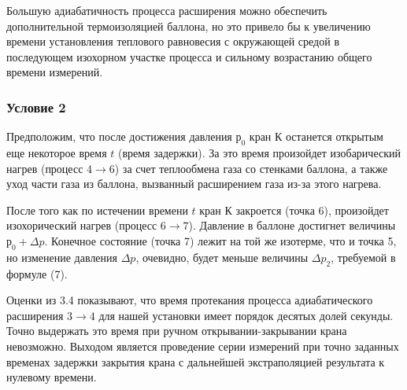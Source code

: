 \documentclass[a4paper,12pt]{article}
\theoremstyle{plain} %
\theoremstyle{definition} %
\theoremstyle{remark} %
\begin{document}
Большую адиабатичность процесса расширения можно обеспечить дополнительной термоизоляцией баллона, но это привело бы к увеличению времени установления теплового равновесия с окружающей средой в последующем изохорном участке процесса и сильному возрастанию общего времени измерений. 

\subsubsection{Условие 2}
Предположим, что после достижения давления $р_0$ кран $\text{К}$ останется открытым еще некоторое время $t$ (время задержки). За это время произойдет изобарический нагрев (процесс $4\rightarrow6$) за счет теплообмена газа со стенками баллона, а также уход части газа из баллона, вызванный расширением газа из-за этого нагрева.

После того как по истечении времени $t$ кран $\text{К}$ закроется (точка 6), произойдет изохорический нагрев (процесс $6\rightarrow7$). Давление в баллоне достигнет величины $р_0 + \Delta p$. Конечное состояние (точка 7) лежит на той же изотерме, что и точка 5, но изменение давления $\Delta p$, очевидно, будет меньше величины $\Delta p_2$, требуемой в формуле (7).

Оценки из 3.4 показывают, что время протекания процесса адиабатического расширения $3\rightarrow4$ для нашей установки имеет порядок десятых долей секунды. Точно выдержать это время при ручном открывании-закрывании крана невозможно. Выходом является проведение серии измерений при точно заданных временах задержки закрытия крана с дальнейшей экстраполяцией результата к нулевому времени.
\end{document}
